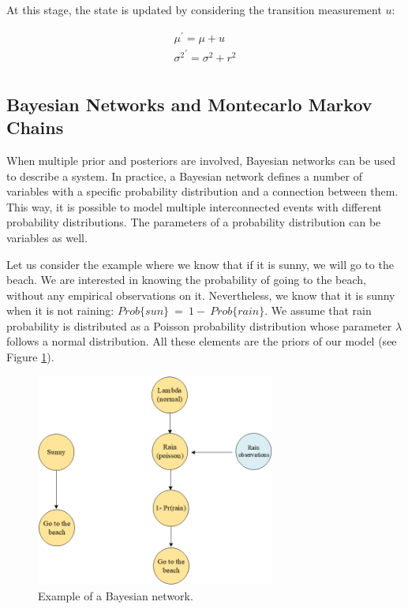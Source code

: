 At this stage, the state is updated by considering the transition measurement $u$:

\begin{equation}
\begin{split}
        \mu^\prime=\mu+u\\
        {\sigma^2}^\prime=\sigma^2+r^2\\
\end{split}
\label{eq_kalmanFilter2}
\end{equation}

\subsection{Bayesian Networks and Montecarlo Markov Chains}

When multiple prior and posteriors are involved, Bayesian networks can be used to describe a system. In practice, a Bayesian network defines a number of variables with a specific probability distribution and a connection between them. This way, it is possible to model multiple interconnected events with different probability distributions. The parameters of a probability distribution can be variables as well.\par

Let us consider the example where we know that if it is sunny, we will go to the beach. We are interested in knowing the probability of going to the beach, without any empirical observations on it. Nevertheless, we know that it is sunny when it is not raining: $Prob\{sun\}\ =\ 1-\ Prob\{rain\}$. We assume that rain probability is distributed as a Poisson probability distribution whose parameter $\lambda$ follows a normal distribution. All these elements are the priors of our model (see Figure \ref{fig_bayesianNetwork}). 

\begin{figure}[hbt!]
\centering
\includegraphics[width=0.7\textwidth]{SectionLetsMath/nonLinearMethods_fig/fig_bayesianNetwork.png}
\captionsetup{type=figure}
\caption{Example of a Bayesian network.}
\label{fig_bayesianNetwork}
\end{figure}

